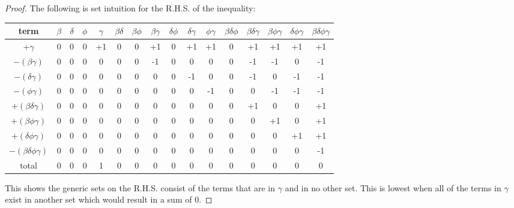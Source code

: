 \documentclass[manuscript]{acmart}
\begin{document}
\begin{proof}
        The following is set intuition for the R.H.S. of the inequality:

        \begin{center}
            \begin{tabular}{ |c|c|c|c|c|c|c|c|c|c|c|c|c|c|c|c| }
                \hline
                term & $\beta$ & $\delta$ & $\phi$ & $\gamma$ & 
                $\beta \delta$ & $\beta \phi$ & $\beta \gamma$ & 
                $\delta \phi$ & $\delta \gamma$ & $\phi \gamma$ &
                $\beta \delta \phi$ & $\beta \delta \gamma$ &
                $\beta \phi \gamma$ & $\delta \phi \gamma$ &
                $\beta \delta \phi \gamma$\\
                \hline
                $ + \gamma$ & 0 & 0 & 0 & +1 & 0 & 0 & +1 & 0 & +1 & +1 & 0 & +1 & +1 & +1 & +1 \\
                \hline
                $- (\beta \gamma)$ & 0 & 0 & 0 & 0 & 0 & 0 & -1 & 0 & 0 & 0 & 0 & -1 & -1 & 0 & -1 \\
                \hline
                $- (\delta \gamma)$ & 0 & 0 & 0 & 0 & 0 & 0 & 0 & 0 & -1 & 0 & 0 & -1 & 0 & -1 & -1 \\
                \hline
                $- (\phi \gamma)$ & 0 & 0 & 0 & 0 & 0 & 0 & 0 & 0 & 0 & -1 & 0 & 0 & -1 & -1 & -1 \\
                \hline
                $+ (\beta \delta \gamma)$ & 0 & 0 & 0 & 0 & 0 & 0 & 0 & 0 & 0 & 0 & 0 & +1 & 0 & 0 & +1 \\
                \hline
                $+ (\beta \phi \gamma)$ & 0 & 0 & 0 & 0 & 0 & 0 & 0 & 0 & 0 & 0 & 0 & 0 & +1 & 0 & +1 \\
                \hline
                $+ (\delta \phi \gamma)$ & 0 & 0 & 0 & 0 & 0 & 0 & 0 & 0 & 0 & 0 & 0 & 0 & 0 & +1 & +1 \\
                \hline
                $- (\beta \delta \phi \gamma)$ & 0 & 0 & 0 & 0 & 0 & 0 & 0 & 0 & 0 & 0 & 0 & 0 & 0 & 0 & -1 \\
                \hline
                total & 0 & 0 & 0 & 1 & 0 & 0 & 0 & 0 & 0 & 0 & 0 & 0 & 0 & 0 & 0 \\
                \hline
            \end{tabular}
        \end{center}

        This shows the generic sets on the R.H.S. consist of the terms that
        are in $\gamma$ and in no other set. This is lowest when all of the 
        terms in $\gamma$ exist in another set which would result in a sum of 0.


\end{proof}
\end{document}
